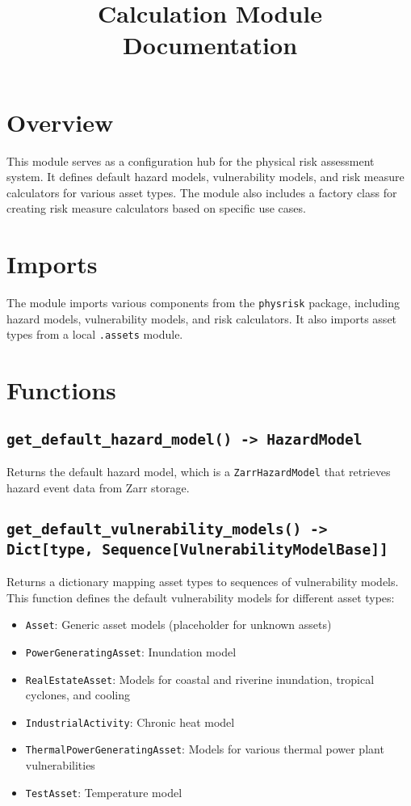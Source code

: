 \documentclass{article}
\title{Calculation Module Documentation}
\author{}
\date{}
\begin{document}
\maketitle

\section{Overview}

This module serves as a configuration hub for the physical risk assessment system. It defines default hazard models, vulnerability models, and risk measure calculators for various asset types. The module also includes a factory class for creating risk measure calculators based on specific use cases.

\section{Imports}

The module imports various components from the \texttt{physrisk} package, including hazard models, vulnerability models, and risk calculators. It also imports asset types from a local \texttt{.assets} module.

\section{Functions}

\subsection{\texttt{get\_default\_hazard\_model() -> HazardModel}}

Returns the default hazard model, which is a \texttt{ZarrHazardModel} that retrieves hazard event data from Zarr storage.

\subsection{\texttt{get\_default\_vulnerability\_models() -> Dict[type, Sequence[VulnerabilityModelBase]]}}

Returns a dictionary mapping asset types to sequences of vulnerability models. This function defines the default vulnerability models for different asset types:

\begin{itemize}
    \item \texttt{Asset}: Generic asset models (placeholder for unknown assets)
    \item \texttt{PowerGeneratingAsset}: Inundation model
    \item \texttt{RealEstateAsset}: Models for coastal and riverine inundation, tropical cyclones, and cooling
    \item \texttt{IndustrialActivity}: Chronic heat model
    \item \texttt{ThermalPowerGeneratingAsset}: Models for various thermal power plant vulnerabilities
    \item \texttt{TestAsset}: Temperature model
\end{itemize}
\end{document}
